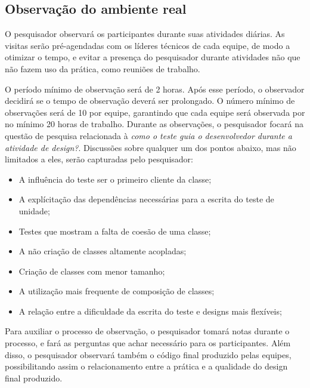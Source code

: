 \subsection{Observação do ambiente real}
\label{sec:planejamento-observacao}

O pesquisador observará os participantes durante suas atividades diárias. As
visitas serão pré-agendadas com os líderes técnicos de cada equipe, de modo a
otimizar o tempo, e evitar a presença do pesquisador durante atividades
não que não fazem uso da prática, como reuniões de trabalho.

O período mínimo de observação será de 2 horas. Após esse período, o observador
decidirá se o tempo de observação deverá ser prolongado. O número mínimo de
observações será de 10 por equipe, garantindo que cada equipe será observada por
no mínimo 20 horas de trabalho. Durante as observações, o pesquisador focará na
questão de pesquisa relacionada à \textit{como o teste guia o desenvolvedor
durante a atividade de design?}. Discussões sobre qualquer um dos pontos abaixo, 
mas não limitados a eles, serão capturadas pelo pesquisador:

\begin{itemize}
  
  \item A influência do teste ser o primeiro cliente da classe;

  \item A explícitação das dependências necessárias para a escrita do teste de
  unidade;

  \item Testes que mostram a falta de coesão de uma classe;

  \item A não criação de classes altamente acopladas;

  \item Criação de classes com menor tamanho;

  \item A utilização mais frequente de composição de classes;
  
  \item A relação entre a dificuldade da escrita do teste e designs mais
  flexíveis;

\end{itemize}

Para auxiliar o processo de observação, o pesquisador tomará notas durante o
processo, e fará as perguntas que achar necessário para os participantes. Além
disso, o pesquisador observará também o código final produzido pelas equipes,
possibilitando assim o relacionamento entre a prática e a qualidade do design
final produzido.

